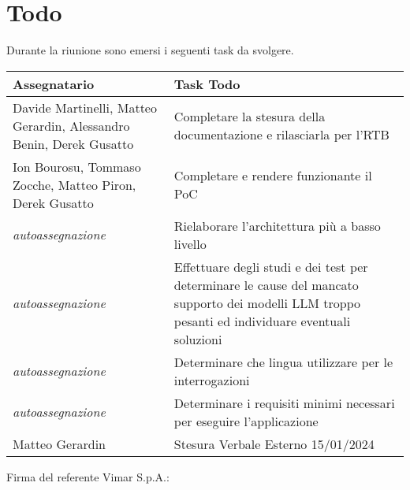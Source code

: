 \section{Todo}
Durante la riunione sono emersi i seguenti task da svolgere.

\begin{center}
  \begin{tabular}{|p{5cm}|p{8cm}|}
    \hline
    \textbf{Assegnatario}       & \textbf{Task Todo} \\ \hline
        Davide Martinelli, Matteo Gerardin, Alessandro Benin, Derek Gusatto & Completare la stesura della documentazione e rilasciarla per l'RTB \\ \hline
        Ion Bourosu, Tommaso Zocche, Matteo Piron, Derek Gusatto & Completare e rendere funzionante il PoC \\ \hline
        \textit{autoassegnazione} & Rielaborare l'architettura più a basso livello \\ \hline
        \textit{autoassegnazione} & Effettuare degli studi e dei test per determinare le cause del mancato supporto dei modelli LLM troppo pesanti ed individuare eventuali soluzioni \\ \hline
        \textit{autoassegnazione} & Determinare che lingua utilizzare per le interrogazioni \\ \hline
        \textit{autoassegnazione} & Determinare i requisiti minimi necessari per eseguire l'applicazione \\ \hline
        Matteo Gerardin & Stesura Verbale Esterno 15/01/2024 \\ \hline
  \end{tabular}
\end{center}

\vspace{4cm}
\noindent Firma del referente Vimar S.p.A.: \underline{\hspace{5cm}}
